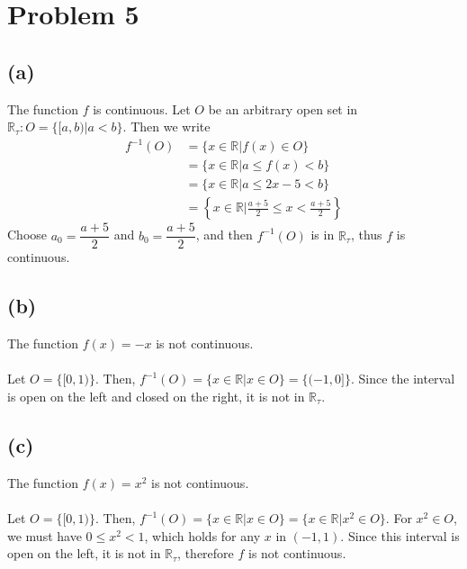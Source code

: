 \documentclass{article}
\begin{document}
\section*{Problem 5}
\subsection*{(a)}
The function $f$ is continuous.
Let $O$ be an arbitrary open set in $\mathbb{R}_{\tau} : O = \{ [a, b) | a < b\}$.
Then we write
\begin{align*}
    f^{-1}(O)
    & = \{ x \in \mathbb{R} | f(x) \in O \} \\
    & = \{ x \in \mathbb{R} | a \leqslant f(x) < b \} \\
    & = \{ x \in \mathbb{R} | a \leqslant 2x - 5 < b \} \\
    & = \left\{ x \in \mathbb{R} \bigg| \frac{a + 5}{2} \leqslant x < \frac{a+5}{2}\right\}
\end{align*}
Choose $a_0 = \dfrac{a + 5}{2}$ and $b_0 = \dfrac{a+5}{2}$, and then $f^{-1}(O)$ is in $\mathbb{R}_{\tau}$, thus $f$ is continuous.
\subsection*{(b)}
The function $f(x) = -x$ is not continuous.
\\\\
Let $O = \{[0,1)\}$.
Then, $f^{-1}(O) = \{x \in \mathbb{R} | x \in O\} = \{ (-1, 0]\}$.
Since the interval is open on the left and closed on the right, it is not in $\mathbb{R}_{\tau}$.

\subsection*{(c)}
The function $f(x) = x^2$ is not continuous.
\\\\
 Let $O = \{[0, 1)\}$.
Then, $f^{-1}(O) = \{x \in \mathbb{R} | x \in O\} = \{x \in \mathbb{R} | x^2 \in O\}$.
For $x^2 \in O$, we must have $0 \leqslant x^2 < 1$, which holds for any $x$ in $(-1,1)$.
Since this interval is open on the left, it is not in $\mathbb{R}_{\tau}$, therefore $f$ is not continuous.
\end{document}
